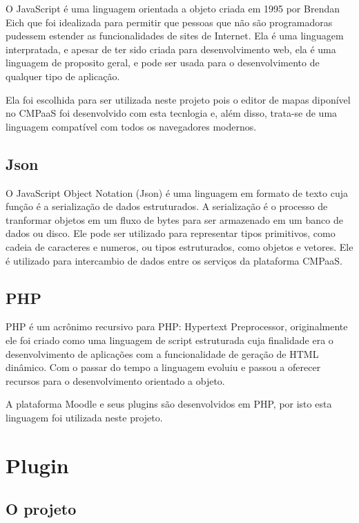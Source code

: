 \documentclass[
	12pt,				%
	openright,			%
	oneside,			%
	a4paper,			%
	english,			%
	french,				%
	spanish,			%
	brazil				%
	]{abntex2}
\begin{document}
O JavaScript é uma linguagem orientada a objeto criada em 1995 por Brendan Eich que foi idealizada para permitir que pessoas que não são programadoras pudessem estender as funcionalidades de sites de Internet\cite{Richards2010}. Ela é uma linguagem interpratada, e apesar de ter sido criada para desenvolvimento web, ela é uma linguagem de proposito geral, e pode ser usada para o desenvolvimento de qualquer tipo de aplicação\cite{flanagan2006}.

Ela foi escolhida para ser utilizada neste projeto pois o editor de mapas diponível no CMPaaS foi desenvolvido com esta tecnlogia e, além disso, trata-se de uma linguagem compatível com todos os navegadores modernos.  

\section{Json}

O JavaScript Object Notation (Json) é uma linguagem em formato de texto cuja função é a serialização de dados estruturados. A serialização é o processo de tranformar objetos em um fluxo de bytes para ser armazenado em um banco de dados ou disco. Ele pode ser utilizado para representar tipos primitivos, como cadeia de caracteres e numeros, ou tipos estruturados, como objetos e vetores\cite{crockford2006}. Ele é utilizado para intercambio de dados entre os serviços da plataforma CMPaaS.  

\section{PHP}
PHP é um acrônimo recursivo para PHP: Hypertext Preprocessor, originalmente ele foi criado como uma linguagem de script estruturada cuja finalidade era o desenvolvimento de aplicações com a funcionalidade de geração de HTML dinâmico. Com o passar do tempo a linguagem evoluiu e passou a oferecer recursos para o desenvolvimento orientado a objeto\cite{minetto2007}.

A plataforma Moodle e seus plugins são desenvolvidos em PHP, por isto esta linguagem foi utilizada neste projeto. 

 

\chapter{Plugin}
\section{O projeto}
\end{document}
